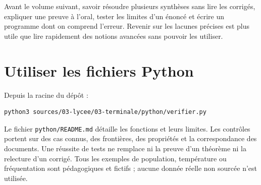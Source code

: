 Avant le volume suivant, savoir résoudre plusieurs synthèses sans lire les corrigés, expliquer une preuve à l'oral, tester les limites d'un énoncé et écrire un programme dont on comprend l'erreur. Revenir sur les lacunes précises est plus utile que lire rapidement des notions avancées sans pouvoir les utiliser.
\section{Utiliser les fichiers Python}
Depuis la racine du dépôt :
\begin{lstlisting}[language=bash]
python3 sources/03-lycee/03-terminale/python/verifier.py
\end{lstlisting}
Le fichier \texttt{python/README.md} détaille les fonctions et leurs limites. Les contrôles portent sur des cas connus, des frontières, des propriétés et la correspondance des documents. Une réussite de tests ne remplace ni la preuve d'un théorème ni la relecture d'un corrigé.
Tous les exemples de population, température ou fréquentation sont pédagogiques et fictifs ; aucune donnée réelle non sourcée n'est utilisée.
